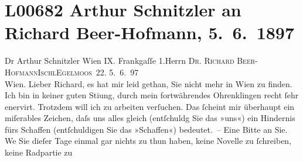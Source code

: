 

\section[Arthur Schnitzler an Richard Beer-Hofmann, 5. 6. 1897]{L00682 Arthur Schnitzler an Richard Beer-Hofmann, 5. 6. 1897}
\nopagebreak{}
\rehead{ }\normalsize\beginnumbering{}
\toendnotes[C]{\smallbreak\pagebreak[2]}
\toendnotes[C]{\smallbreak}\pstart{}{\pb}Dr Arthur Schnitzler Wien IX. Frankgaſſe 1.\pend{}{\bigskip}\pstart{}{\pb}Herrn \textsc{Dr. Richard
                     Beer-Hofmann}\pend{}\pstart{}\textsc{Ischl}\pend{}\pstart{}\textsc{Egelmoos 22}.\pend{}{\bigskip}\vspace{1em}
\pstart
           \raggedleft{}{\pb}5. 6. 97{\\}Wien. \pend
           \vspace{0.5em}
\pstart
           Lieber Richard, es hat mir leid gethan, Sie nicht mehr in Wien zu finden. Ich bin in keiner guten Sti{\geminationm}ung, durch mein fortwährendes Ohrenklingen recht ſehr
               enervirt. Trotzdem will ich zu arbeiten verſuchen. Das ſcheint mir überhaupt ein
               miſerables Zeichen, daſs uns alles gleich (entſchuldg Sie das »uns«) ein Hindernis
               fürs {\pb}Schaffen (entſchuldigen Sie das »Schaffen«)
               bedeutet. – Eine Bitte an Sie. We{\geminationn} Sie dieſer Tage
               einmal gar nichts zu thun haben, keine Novelle zu ſchreiben, keine Radpartie zu
